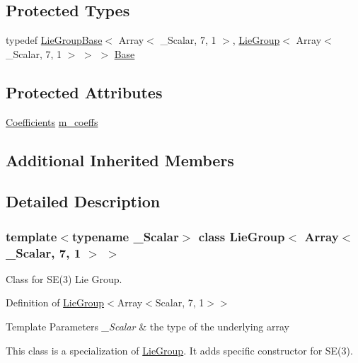 \subsection*{Protected Types}
\begin{DoxyCompactItemize}
\item 
typedef \hyperlink{class_lie_group_base}{Lie\+Group\+Base}$<$ Array$<$ \+\_\+\+Scalar, 7, 1 $>$, \hyperlink{class_lie_group}{Lie\+Group}$<$ Array$<$ \+\_\+\+Scalar, 7, 1 $>$ $>$ $>$ \hyperlink{class_lie_group_3_01_array_3_01___scalar_00_017_00_011_01_4_01_4_a2f9c6357e55ba5e895a849c32e18b3c4}{Base}
\end{DoxyCompactItemize}
\subsection*{Protected Attributes}
\begin{DoxyCompactItemize}
\item 
\hyperlink{class_lie_group_3_01_array_3_01___scalar_00_017_00_011_01_4_01_4_aa5d0fac468a8bdbb468bf2218b93ee0e}{Coefficients} \hyperlink{class_lie_group_3_01_array_3_01___scalar_00_017_00_011_01_4_01_4_addbc1e13772e419af9c3cbea4d31bfdf}{m\+\_\+coeffs}
\end{DoxyCompactItemize}
\subsection*{Additional Inherited Members}


\subsection{Detailed Description}
\subsubsection*{template$<$typename \+\_\+\+Scalar$>$\newline
class Lie\+Group$<$ Array$<$ \+\_\+\+Scalar, 7, 1 $>$ $>$}

Class for S\+E(3) Lie Group. 

Definition of \hyperlink{class_lie_group}{Lie\+Group}$<$Array$<$\+Scalar, 7, 1$>$$>$


\begin{DoxyTemplParams}{Template Parameters}
{\em \+\_\+\+Scalar} & the type of the underlying array\\
\hline
\end{DoxyTemplParams}
This class is a specialization of \hyperlink{class_lie_group}{Lie\+Group}. It adds specific constructor for S\+E(3).

